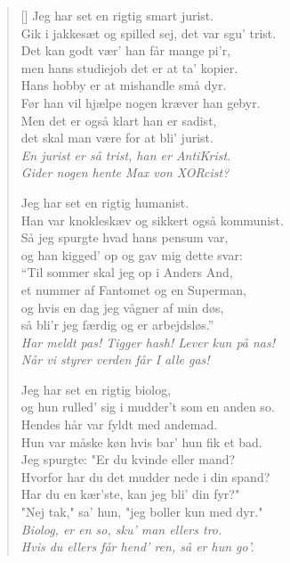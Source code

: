 {\begin{multicols}
\begin{verse}[\versewidth]
Jeg har set en rigtig smart jurist.\\
Gik i jakkesæt og spilled sej, det var sgu’ trist.\\
Det kan godt vær’ han får mange pi’r,\\
men hans studiejob det er at ta’ kopier.\\
Hans hobby er at mishandle små dyr.\\
Før han vil hjælpe nogen kræver han gebyr.\\
Men det er også klart han er sadist,\\
det skal man være for at bli’ jurist.\\
\emph{En jurist er så trist, han er AntiKrist.\\
Gider nogen hente Max von XORcist?}

Jeg har set en rigtig humanist.\\
Han var knokleskæv og sikkert også kommunist.\\
Så jeg spurgte hvad hans pensum var,\\
og han kigged’ op og gav mig dette svar:\\
\columnbreak
``Til sommer skal jeg op i Anders And,\\
et nummer af Fantomet og en Superman,\\
og hvis en dag jeg vågner af min døs,\\
så bli’r jeg færdig og er arbejdsløs.''\\
\emph{Har meldt pas! Tigger hash! Lever kun på nas!\\
Når vi styrer verden får I alle gas!}

Jeg har set en rigtig biolog,\\
og hun rulled’ sig i mudder’t som en anden so.\\
Hendes hår var fyldt med andemad.\\
Hun var måske køn hvis bar’ hun fik et bad.\\
Jeg spurgte: "Er du kvinde eller mand?\\
Hvorfor har du det mudder nede i din spand?\\
Har du en kær’ste, kan jeg bli’ din fyr?"\\
"Nej tak," sa’ hun, "jeg boller kun med dyr."\\
\emph{Biolog, er en so, sku’ man ellers tro.\\
Hvis du ellers får hend’ ren, så er hun go’.}


\end{verse}
\end{multicols}}
